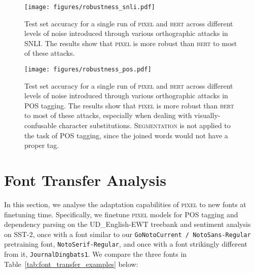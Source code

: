 \documentclass{article}
\newcommand{\model}{\textsc{pixel}\xspace}
\begin{document}
\begin{figure}[ht!]
  \centering
  \texttt{[image: figures/robustness\_snli.pdf]}\caption{Test set accuracy for a single run of \model{} and \textsc{bert} across different levels of noise introduced through various orthographic attacks in SNLI. The results show that \model is more robust than \textsc{bert} to most of these attacks.}
  \label{fig:robustness_snli}
\end{figure}

\begin{figure}[ht!]
  \centering
  \texttt{[image: figures/robustness\_pos.pdf]}\caption{Test set accuracy for a single run of \model{} and \textsc{bert} across different levels of noise introduced through various orthographic attacks in POS tagging. The results show that \model is more robust than \textsc{bert} to most of these attacks, especially when dealing with visually-confusable character substitutions. \textsc{Segmentation} is not applied to the task of POS tagging, since the joined words would not have a proper tag.}
  \label{fig:robustness_pos}
\end{figure}

\section{Font Transfer Analysis}
\label{app:font_transfer}

In this section, we analyse the adaptation capabilities of \model to new fonts at finetuning time. Specifically, we finetune \model models for POS tagging and dependency parsing on the UD\_English-EWT treebank and sentiment analysis on SST-2, once with a font similar to our  {\footnotesize \texttt{GoNotoCurrent / NotoSans-Regular}} pretraining font, {\footnotesize \texttt{NotoSerif-Regular}}, and once with a font strikingly different from it, {\footnotesize\texttt{JournalDingbats1}}. We compare the three fonts in Table~\ref{tab:font_transfer_examples} below:

\begin{table}[ht]
\centering
{}
\caption{An example sentence rendered in three different fonts.}
\label{tab:font_transfer_examples} 
\end{table}
\end{document}
